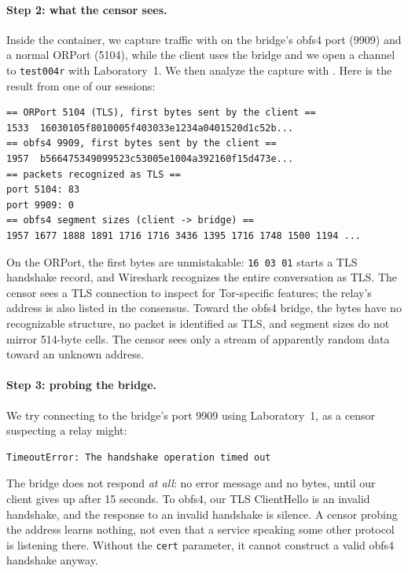 \paragraph{Step 2: what the censor sees.} Inside the container, we capture traffic with  on the bridge's obfs4 port (9909) and a normal ORPort (5104), while the client uses the bridge and we open a channel to \texttt{test004r} with Laboratory~1. We then analyze the capture with . Here is the result from one of our sessions:
\begin{lstlisting}[numbers=none]
== ORPort 5104 (TLS), first bytes sent by the client ==
1533  16030105f8010005f403033e1234a0401520d1c52b...
== obfs4 9909, first bytes sent by the client ==
1957  b566475349099523c53005e1004a392160f15d473e...
== packets recognized as TLS ==
port 5104: 83
port 9909: 0
== obfs4 segment sizes (client -> bridge) ==
1957 1677 1888 1891 1716 1716 3436 1395 1716 1748 1500 1194 ...
\end{lstlisting}
On the ORPort, the first bytes are unmistakable: \texttt{16 03 01} starts a TLS handshake record, and Wireshark recognizes the entire conversation as TLS. The censor sees a TLS connection to inspect for Tor-specific features; the relay's address is also listed in the consensus. Toward the obfs4 bridge, the bytes have no recognizable structure, no packet is identified as TLS, and segment sizes do not mirror 514-byte cells. The censor sees only a stream of apparently random data toward an unknown address.

\paragraph{Step 3: probing the bridge.} We try connecting to the bridge's port 9909 using Laboratory~1, as a censor suspecting a relay might:
\begin{lstlisting}[numbers=none]
TimeoutError: The handshake operation timed out
\end{lstlisting}
The bridge does not respond \emph{at all}: no error message and no bytes, until our client gives up after 15 seconds. To obfs4, our TLS ClientHello is an invalid handshake, and the response to an invalid handshake is silence. A censor probing the address learns nothing, not even that a service speaking some other protocol is listening there. Without the \texttt{cert} parameter, it cannot construct a valid obfs4 handshake anyway.

